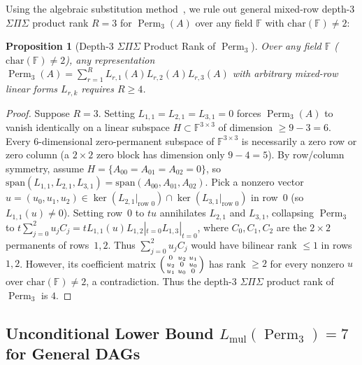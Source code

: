 \documentclass[11pt,a4paper]{article}
\newtheorem{proposition}[theorem]{Proposition}
\newcommand{\Perm}{\operatorname{Perm}}
\begin{document}
Using the algebraic substitution method~\cite{bcs1997,landsberg2012}, we rule out general mixed-row depth-3 $\Sigma\Pi\Sigma$ product rank $R = 3$ for $\Perm_3(A)$ over any field $\mathbb{F}$ with $\mathrm{char}(\mathbb{F}) \neq 2$:
\begin{proposition}[Depth-3 $\Sigma\Pi\Sigma$ Product Rank of $\Perm_3$]
Over any field $\mathbb{F}$ ($\mathrm{char}(\mathbb{F}) \neq 2$), any representation $\Perm_3(A) = \sum_{r=1}^R L_{r,1}(A) L_{r,2}(A) L_{r,3}(A)$ with arbitrary mixed-row linear forms $L_{r,k}$ requires $R \ge 4$.
\end{proposition}
\begin{proof}
Suppose $R = 3$. Setting $L_{1,1} = L_{2,1} = L_{3,1} = 0$ forces $\Perm_3(A)$ to vanish identically on a linear subspace $H \subset \mathbb{F}^{3 \times 3}$ of dimension $\ge 9 - 3 = 6$. Every 6-dimensional zero-permanent subspace of $\mathbb{F}^{3 \times 3}$ is necessarily a zero row or zero column (a $2 \times 2$ zero block has dimension only $9 - 4 = 5$). By row/column symmetry, assume $H = \{A_{00} = A_{01} = A_{02} = 0\}$, so $\mathrm{span}(L_{1,1}, L_{2,1}, L_{3,1}) = \mathrm{span}(A_{00}, A_{01}, A_{02})$. Pick a nonzero vector $u = (u_0, u_1, u_2) \in \ker(L_{2,1}|_{\text{row }0}) \cap \ker(L_{3,1}|_{\text{row }0})$ in row~$0$ (so $L_{1,1}(u) \neq 0$). Setting row~$0$ to $t u$ annihilates $L_{2,1}$ and $L_{3,1}$, collapsing $\Perm_3$ to $t \sum_{j=0}^2 u_j C_j = t L_{1,1}(u) L_{1,2}|_{t=0} L_{1,3}|_{t=0}$, where $C_0, C_1, C_2$ are the $2 \times 2$ permanents of rows~$1,2$. Thus $\sum_{j=0}^2 u_j C_j$ would have bilinear rank $\le 1$ in rows~$1,2$. However, its coefficient matrix $\begin{psmallmatrix} 0 & u_2 & u_1 \\ u_2 & 0 & u_0 \\ u_1 & u_0 & 0 \end{psmallmatrix}$ has rank $\ge 2$ for every nonzero $u$ over $\mathrm{char}(\mathbb{F}) \neq 2$, a contradiction. Thus the depth-3 $\Sigma\Pi\Sigma$ product rank of $\Perm_3$ is $4$.
\end{proof}

\subsection{Unconditional Lower Bound $L_{\mathrm{mul}}(\Perm_3) = 7$ for General DAGs}
\end{document}
